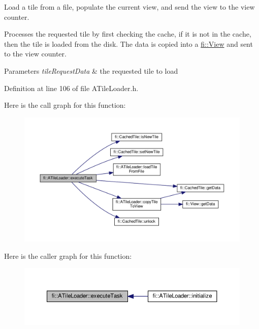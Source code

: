 Load a tile from a file, populate the current view, and send the view to the view counter. 

Processes the requested tile by first checking the cache, if it is not in the cache, then the tile is loaded from the disk. The data is copied into a \hyperlink{classfi_1_1View}{fi\+::\+View} and sent to the view counter. 
\begin{DoxyParams}{Parameters}
{\em tile\+Request\+Data} & the requested tile to load \\
\hline
\end{DoxyParams}


Definition at line 106 of file A\+Tile\+Loader.\+h.

Here is the call graph for this function\+:
\nopagebreak
\begin{figure}[H]
\begin{center}
\leavevmode
\includegraphics[width=350pt]{dc/d54/classfi_1_1ATileLoader_ab3fb2e90d11d160e89c6b8a7df684c7f_cgraph}
\end{center}
\end{figure}
Here is the caller graph for this function\+:
\nopagebreak
\begin{figure}[H]
\begin{center}
\leavevmode
\includegraphics[width=350pt]{dc/d54/classfi_1_1ATileLoader_ab3fb2e90d11d160e89c6b8a7df684c7f_icgraph}
\end{center}
\end{figure}
\mbox{\label{classfi_1_1ATileLoader_a20ce7ee013801a64dedc95c2a3b9be7f}} 
